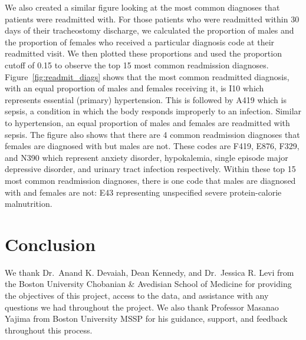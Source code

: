 \documentclass[sn-basic,pdflatex]{sn-jnl}
\theoremstyle{remark}
\theoremstyle{definition}
\begin{document}
We also created a similar figure looking at the most common diagnoses
that patients were readmitted with. For those patients who were
readmitted within 30 days of their tracheostomy discharge, we calculated
the proportion of males and the proportion of females who received a
particular diagnosis code at their readmitted visit. We then plotted
these proportions and used the proportion cutoff of 0.15 to observe the
top 15 most common readmission diagnoses.\newline \newline
Figure~\ref{fig:readmit_diags} shows that the most common readmitted
diagnosis, with an equal proportion of males and females receiving it,
is I10 which represents essential (primary) hypertension. This is
followed by A419 which is sepsis, a condition in which the body responds
improperly to an infection. Similar to hypertension, an equal proportion
of males and females are readmitted with sepsis. \newline \newline The
figure also shows that there are 4 common readmission diagnoses that
females are diagnosed with but males are not. These codes are F419,
E876, F329, and N390 which represent anxiety disorder, hypokalemia,
single episode major depressive disorder, and urinary tract infection
respectively. Within these top 15 most common readmission diagnoses,
there is one code that males are diagnosed with and females are not: E43
representing unspecified severe protein-calorie malnutrition.

\hypertarget{sec5}{%
\section{Conclusion}\label{sec5}}


We thank Dr.~Anand K. Devaiah, Dean Kennedy, and Dr.~Jessica R. Levi
from the Boston University Chobanian \& Avedisian School of Medicine for
providing the objectives of this project, access to the data, and
assistance with any questions we had throughout the project. We also
thank Professor Masanao Yajima from Boston University MSSP for his
guidance, support, and feedback throughout this process.
\end{document}
